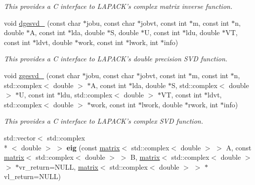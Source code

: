\begin{DoxyCompactItemize}
\begin{DoxyCompactList}\small\item\em This provides a C interface to L\-A\-P\-A\-C\-K's complex matrix inverse function. \end{DoxyCompactList}\item 
\hypertarget{namespacekeycpp_a8fe7a71afbb6c5dc049cdd7afff6c0af}{void \hyperlink{namespacekeycpp_a8fe7a71afbb6c5dc049cdd7afff6c0af}{dgesvd\-\_\-} (const char $\ast$jobu, const char $\ast$jobvt, const int $\ast$m, const int $\ast$n, double $\ast$A, const int $\ast$lda, double $\ast$S, double $\ast$U, const int $\ast$ldu, double $\ast$V\-T, const int $\ast$ldvt, double $\ast$work, const int $\ast$lwork, int $\ast$info)}\label{namespacekeycpp_a8fe7a71afbb6c5dc049cdd7afff6c0af}

\begin{DoxyCompactList}\small\item\em This provides a C interface to L\-A\-P\-A\-C\-K's double precision S\-V\-D function. \end{DoxyCompactList}\item 
\hypertarget{namespacekeycpp_afa5e2f74110f53bd288c15ce1f183f9b}{void \hyperlink{namespacekeycpp_afa5e2f74110f53bd288c15ce1f183f9b}{zgesvd\-\_\-} (const char $\ast$jobu, const char $\ast$jobvt, const int $\ast$m, const int $\ast$n, std\-::complex$<$ double $>$ $\ast$A, const int $\ast$lda, double $\ast$S, std\-::complex$<$ double $>$ $\ast$U, const int $\ast$ldu, std\-::complex$<$ double $>$ $\ast$V\-T, const int $\ast$ldvt, std\-::complex$<$ double $>$ $\ast$work, const int $\ast$lwork, double $\ast$rwork, int $\ast$info)}\label{namespacekeycpp_afa5e2f74110f53bd288c15ce1f183f9b}

\begin{DoxyCompactList}\small\item\em This provides a C interface to L\-A\-P\-A\-C\-K's complex S\-V\-D function. \end{DoxyCompactList}\item 
\hypertarget{namespacekeycpp_a6aca656320e1b26861469a979a96066f}{std\-::vector$<$ std\-::complex\\*
$<$ double $>$ $>$ {\bfseries eig} (const \hyperlink{classkeycpp_1_1matrix}{matrix}$<$ std\-::complex$<$ double $>$ $>$ A, const \hyperlink{classkeycpp_1_1matrix}{matrix}$<$ std\-::complex$<$ double $>$ $>$ B, \hyperlink{classkeycpp_1_1matrix}{matrix}$<$ std\-::complex$<$ double $>$ $>$ $\ast$vr\-\_\-return=N\-U\-L\-L, \hyperlink{classkeycpp_1_1matrix}{matrix}$<$ std\-::complex$<$ double $>$ $>$ $\ast$vl\-\_\-return=N\-U\-L\-L)}\label{namespacekeycpp_a6aca656320e1b26861469a979a96066f}


\end{DoxyCompactItemize}
